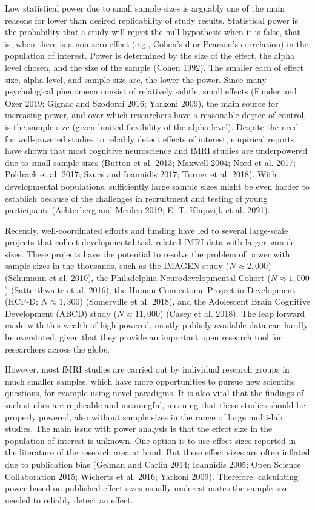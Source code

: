 \documentclass[
  letterpaper,
  DIV=11,
  numbers=noendperiod]{scrartcl}
\begin{document}
Low statistical power due to small sample sizes is arguably one of the
main reasons for lower than desired replicability of study results.
Statistical power is the probability that a study will reject the null
hypothesis when it is false, that is, when there is a non-zero effect
(e.g., Cohen's d or Pearson's correlation) in the population of
interest. Power is determined by the size of the effect, the alpha level
chosen, and the size of the sample (Cohen 1992). The smaller each of
effect size, alpha level, and sample size are, the lower the power.
Since many psychological phenomena consist of relatively subtle, small
effects (Funder and Ozer 2019; Gignac and Szodorai 2016; Yarkoni 2009),
the main source for increasing power, and over which researchers have a
reasonable degree of control, is the sample size (given limited
flexibility of the alpha level). Despite the need for well-powered
studies to reliably detect effects of interest, empirical reports have
shown that most cognitive neuroscience and fMRI studies are underpowered
due to small sample sizes (Button et al. 2013; Maxwell 2004; Nord et al.
2017; Poldrack et al. 2017; Szucs and Ioannidis 2017; Turner et al.
2018). With developmental populations, sufficiently large sample sizes
might be even harder to establish because of the challenges in
recruitment and testing of young participants (Achterberg and Meulen
2019; E. T. Klapwijk et al. 2021).

Recently, well-coordinated efforts and funding have led to several
large-scale projects that collect developmental task-related fMRI data
with larger sample sizes. These projects have the potential to resolve
the problem of power with sample sizes in the thousands, such as the
IMAGEN study (\(N ≈ 2,000\)) (Schumann et al. 2010), the Philadelphia
Neurodevelopmental Cohort (\(N ≈ 1,000\)) (Satterthwaite et al. 2016),
the Human Connectome Project in Development (HCP-D; \(N ≈ 1,300\))
(Somerville et al. 2018), and the Adolescent Brain Cognitive Development
(ABCD) study (\(N ≈ 11,000\)) (Casey et al. 2018). The leap forward made
with this wealth of high-powered, mostly publicly available data can
hardly be overstated, given that they provide an important open research
tool for researchers across the globe.

However, most fMRI studies are carried out by individual research groups
in much smaller samples, which have more opportunities to pursue new
scientific questions, for example using novel paradigms. It is also
vital that the findings of such studies are replicable and meaningful,
meaning that these studies should be properly powered, also without
sample sizes in the range of large multi-lab studies. The main issue
with power analysis is that the effect size in the population of
interest is unknown. One option is to use effect sizes reported in the
literature of the research area at hand. But these effect sizes are
often inflated due to publication bias (Gelman and Carlin 2014;
Ioannidis 2005; Open Science Collaboration 2015; Wicherts et al. 2016;
Yarkoni 2009). Therefore, calculating power based on published effect
sizes usually underestimates the sample size needed to reliably detect
an effect.
\end{document}
